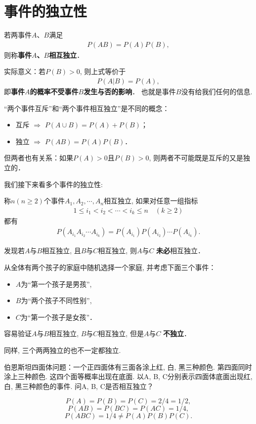 \section{事件的独立性}

\begin{definition}
    若两事件$A$、$B$满足
    \begin{align*}
        P(AB)= P(A) P(B),
    \end{align*}
    则称\textbf{事件$A$、$B$相互独立}．%
\end{definition}

实际意义：若$P(B)>0$, 则上式等价于
\begin{align*}
    P(A|B)= P(A),
\end{align*}
即\textbf{事件$A$的概率不受事件$B$发生与否的影响}． 也就是事件$B$没有给我们任何的信息.

\begin{remark}
    “两个事件互斥”和“两个事件相互独立”是不同的概念：
    \begin{itemize}
        \item 互斥 $\Rightarrow$ $P(A\cup B)=P(A)+P(B)$；
        \item 独立 $\Rightarrow$ $P(AB)=P(A)P(B)$．
    \end{itemize}
    但两者也有关系：如果$P(A)>0$且$P(B)>0$, 则两者不可能既是互斥的又是独立的．
\end{remark}

我们接下来看多个事件的独立性:

\begin{definition}
    称$n(n\ge 2)$个事件$A_1, A_2, \cdots, A_n$相互独立, 如果对任意一组指标
    \begin{align*}
        1\le i_1<i_2< \cdots <i_k\le n\quad (k\ge 2)
    \end{align*}
    都有
    \begin{align*}
        P(A_{i_1}A_{i_2}\cdots A_{i_k})=P(A_{i_1})P(A_{i_2})\cdots  P(A_{i_k}).
    \end{align*}
\end{definition}

发现若$A$与$B$相互独立, 且$B$与$C$相互独立, 则$A$与$C$ \textbf{未必}相互独立．
\begin{example}
    从全体有两个孩子的家庭中随机选择一个家庭, 并考虑下面三个事件：
    \begin{itemize}
        \item $A$为“第一个孩子是男孩”, 
        \item $B$为“两个孩子不同性别”, 
        \item $C$为“第一个孩子是女孩”．
    \end{itemize}
    容易验证$A$与$B$相互独立, $B$与$C$相互独立, 但是$A$与$C$ \textbf{不独立}．

    同样, 三个两两独立的也不一定都独立.

    伯恩斯坦四面体问题：一个正四面体有三面各涂上红, 白, 黑三种颜色. 第四面同时涂上三种颜色. 这四个面等概率出现在底面. 以A, B, C分别表示四面体底面出现红, 白, 黑三种颜色的事件. 问A, B, C是否相互独立？

    $$
        P(A)=P(B)=P(C)=2/4=1/2,
    $$
    $$
        P(AB)=P(BC)=P(AC)=1/4,
    $$
    $$
        P(ABC)=1/4\neq P(A)P(B)P(C).
    $$
\end{example}
